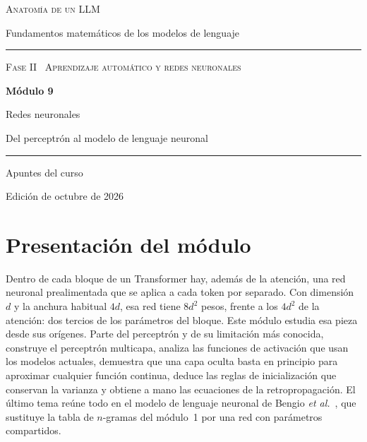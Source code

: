 \documentclass[11pt,a4paper,twoside,openany]{book}
\begin{document}
\frontmatter
\begin{titlepage}
\centering
\vspace*{2.5cm}
{\large\scshape Anatomía de un LLM}\par
\vspace{0.4cm}
{\normalsize Fundamentos matemáticos de los modelos de lenguaje}\par
\vspace{2.2cm}
\rule{\textwidth}{0.8pt}\par\vspace{0.5cm}
{\small\scshape Fase II \textperiodcentered\ Aprendizaje automático y redes neuronales}\par\vspace{0.3cm}
{\Huge\bfseries Módulo 9\par}\vspace{0.3cm}
{\LARGE Redes neuronales\par}
\vspace{0.2cm}
{\large Del perceptrón al modelo de lenguaje neuronal\par}
\vspace{0.5cm}\rule{\textwidth}{0.4pt}\par
\vspace{1.6cm}
{\large Apuntes del curso}\par
\vfill
{\small Edición de octubre de 2026}\par
\end{titlepage}

\chapter*{Presentación del módulo}

Dentro de cada bloque de un Transformer hay, además de la atención, una red neuronal prealimentada que se aplica a cada token por separado. Con dimensión $d$ y la anchura habitual $4d$, esa red tiene $8d^{2}$ pesos, frente a los $4d^{2}$ de la atención: dos tercios de los parámetros del bloque. Este módulo estudia esa pieza desde sus orígenes. Parte del perceptrón y de su limitación más conocida, construye el perceptrón multicapa, analiza las funciones de activación que usan los modelos actuales, demuestra que una capa oculta basta en principio para aproximar cualquier función continua, deduce las reglas de inicialización que conservan la varianza y obtiene a mano las ecuaciones de la retropropagación. El último tema reúne todo en el modelo de lenguaje neuronal de Bengio \emph{et al.}~\cite{bengio}, que sustituye la tabla de $n$-gramas del módulo~1 por una red con parámetros compartidos.
\end{document}

